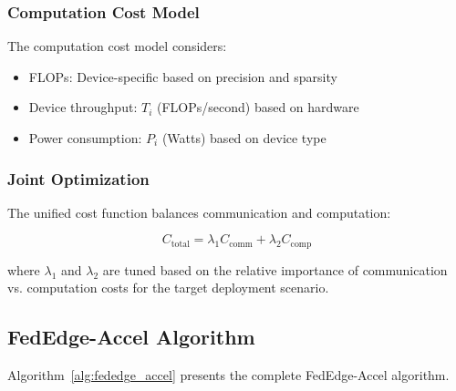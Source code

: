 \documentclass[journal]{IEEEtran}
\begin{document}
\subsubsection{Computation Cost Model}

The computation cost model considers:
\begin{itemize}
    \item FLOPs: Device-specific based on precision and sparsity
    \item Device throughput: $T_i$ (FLOPs/second) based on hardware
    \item Power consumption: $P_i$ (Watts) based on device type
\end{itemize}

\subsubsection{Joint Optimization}

The unified cost function balances communication and computation:

\begin{equation}
C_{\text{total}} = \lambda_1 C_{\text{comm}} + \lambda_2 C_{\text{comp}}
\label{eq:total_cost}
\end{equation}

where $\lambda_1$ and $\lambda_2$ are tuned based on the relative importance of communication vs. computation costs for the target deployment scenario.

\subsection{FedEdge-Accel Algorithm}

Algorithm~\ref{alg:fededge_accel} presents the complete FedEdge-Accel algorithm.
\end{document}
